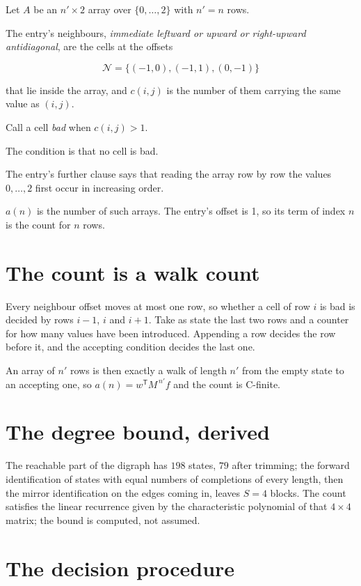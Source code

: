 \documentclass[11pt]{article}
\theoremstyle{definition}
\begin{document}
Let $A$ be an $n' \times 2$ array over $\{0,\dots,2\}$ with $n' = n$ rows.

The entry's neighbours, {\itshape immediate leftward or upward or right-upward antidiagonal}, are the cells at the offsets

\[\mathcal{N} = \{(-1,0), (-1,1), (0,-1)\}\]

that lie inside the array, and $c(i,j)$ is the number of them carrying the same value as $(i,j)$.

Call a cell {\itshape bad} when $c(i,j) > 1$.

The condition is that no cell is bad.

The entry's further clause says that reading the array row by row the values $0,\dots,2$ first occur in increasing order.

$a(n)$ is the number of such arrays. The entry's offset is 1, so its term of index $n$ is the count for $n$ rows.

\section{The count is a walk count}

Every neighbour offset moves at most one row, so whether a cell of row $i$ is bad is decided by rows $i-1$, $i$ and $i+1$. Take as state the last two rows and a counter for how many values have been introduced. Appending a row decides the row before it, and the accepting condition decides the last one.

An array of $n'$ rows is then exactly a walk of length $n'$ from the empty state to an accepting one, so $a(n) = w^{\mathsf T}M^{\,n'}f$ and the count is C-finite.

\section{The degree bound, derived}

The reachable part of the digraph has $198$ states, $79$ after trimming; the forward identification of states with equal numbers of completions of every length, then the mirror identification on the edges coming in, leaves $S = 4$ blocks. The count satisfies the linear recurrence given by the characteristic polynomial of that $4\times4$ matrix; the bound is computed, not assumed.

\section{The decision procedure}
\end{document}
